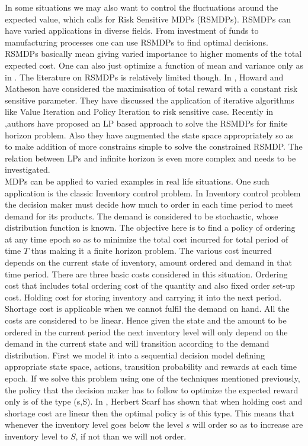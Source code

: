 \documentclass[11pt,a4paper,oneside]{report}
\begin{document}
In some situations we may also want to control the fluctuations around the expected value, which calls for Risk Sensitive MDPs (RSMDPs). RSMDPs can have varied applications in diverse fields. From investment of funds to manufacturing processes one can use RSMDPs to find optimal decisions. RSMDPs basically mean giving varied importance to higher moments of the total expected cost. One can also just optimize a function of mean and variance only as in \citep{mannor2011mean}.  The literature on RSMDPs is relatively limited though. In \cite{howard1972risk}, Howard and Matheson have considered the maximisation of total reward with a constant risk sensitive parameter. They have discussed the application of iterative algorithms like Value Iteration and Policy Iteration to risk sensitive case. Recently in \citep{kumar2015finite} ,authors have proposed an LP based approach to solve the RSMDPs for finite horizon problem. Also they have augmented the state space appropriately so as to make addition of more constrains simple to solve the constrained RSMDP. The relation between LPs and infinite horizon is even more complex and needs to be investigated.\\ 


\noindent MDPs can be applied to varied examples in real life situations. One such application is the classic Inventory control problem. In Inventory control problem the decision maker must decide how much to order in each time period to meet demand for its products. The demand  is considered to be stochastic, whose distribution function is known. The objective here is to find a policy of ordering at any time epoch so as to minimize the total cost incurred for total period of time $T$ thus making it a finite horizon problem. The various cost incurred depends on the current state of inventory, amount ordered and demand in that time period. There are three basic costs considered in this situation. Ordering cost that includes total  ordering cost of the quantity and also fixed order set-up cost. Holding cost for storing inventory and carrying it into the next period. Shortage cost is applicable when we cannot fulfil the demand on hand. All the costs are considered to be linear. Hence given the state and the amount to be ordered in the current period the next inventory level will only depend on the demand in the current state and will transition according to the demand distribution. First we model it into a sequential decision model defining appropriate state space, actions, transition probability and rewards at each time epoch. If we solve this problem using one of the techniques mentioned previously, the policy that the decision maker has to follow to optimize the expected reward only is of the type (s,S). In \cite{scarf1959optimality}, Herbert Scarf has shown that when holding cost and shortage cost are linear then the optimal policy is of this type. This means that whenever the inventory level goes below the level $s$ will order so as to increase are inventory level to $S$, if not than we will not order.\\
\end{document}
